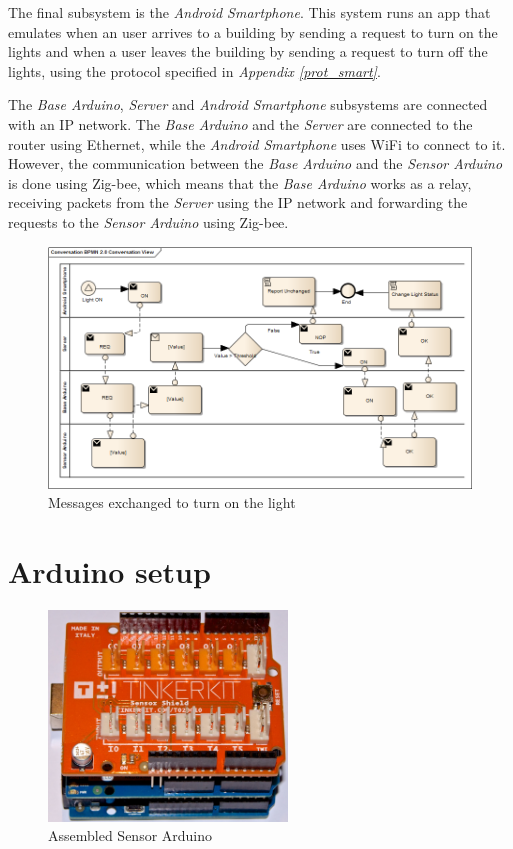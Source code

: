 \documentclass[conference, a4paper]{IEEEtran}
\begin{document}
The final subsystem is the \textit{Android Smartphone}. This system runs an app that emulates when an user arrives to a building by sending a request to turn on the lights and when a user leaves the building by sending a request to turn off the lights, using the protocol specified in \textit{Appendix \ref{prot_smart}}.

The \textit{Base Arduino}, \textit{Server} and \textit{Android Smartphone} subsystems are connected with an IP network. The \textit{Base Arduino} and the \textit{Server} are connected to the router using Ethernet, while the \textit{Android Smartphone} uses WiFi to connect to it. However, the communication between the \textit{Base Arduino} and the \textit{Sensor Arduino} is done using Zig-bee, which means that the \textit{Base Arduino} works as a relay, receiving packets from the \textit{Server} using the IP network and forwarding the requests to the \textit{Sensor Arduino} using Zig-bee.

\begin{figure}
\centering
\includegraphics[width=6in]{ON_Flow}
\caption{Messages exchanged to turn on the light}
\label{fig_on_f}
\end{figure}

\section{Arduino setup}

\begin{figure}[H]
\centering
\includegraphics[width=2.5in]{Sensor_Arduino}
\caption{Assembled Sensor Arduino}
\label{fig_s_ard}
\end{figure}
\end{document}

